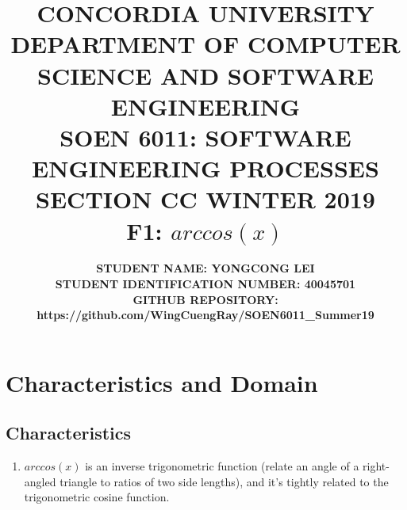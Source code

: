 \documentclass[10pt]{article}
\title{{\large \textbf{CONCORDIA UNIVERSITY \\ DEPARTMENT OF COMPUTER SCIENCE AND SOFTWARE ENGINEERING \\ SOEN 6011: SOFTWARE ENGINEERING PROCESSES \\ SECTION CC WINTER 2019 \\ F1: $arccos(x)$}  \\ }}
\author{\normalsize \textbf {STUDENT NAME: YONGCONG LEI} \\ \normalsize \textbf{STUDENT IDENTIFICATION NUMBER: 40045701} \\ \normalsize \textbf{GITHUB REPOSITORY: https://github.com/WingCuengRay/SOEN6011\_Summer19}}
\date{}
\begin{document}
\maketitle

\section{Characteristics and Domain}
\subsection{Characteristics}

\begin{enumerate}
    \item $arccos(x)$ is an inverse trigonometric function (relate an angle of a right-angled triangle to ratios of two side lengths), and it's tightly related to the trigonometric cosine function.
    

\end{enumerate}
\end{document}
